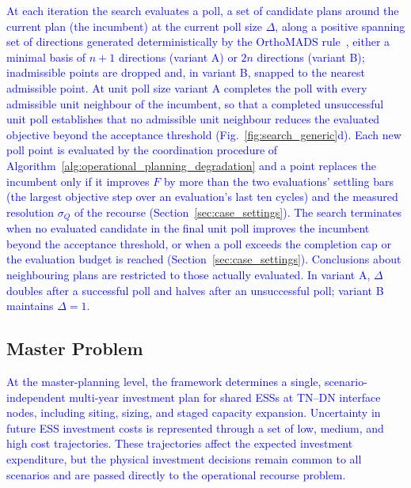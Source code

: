 \documentclass[preprint,12pt]{elsarticle}
\begin{document}
\textcolor{blue}{
    At each iteration the search evaluates a poll, a set of candidate plans around the current plan (the incumbent) at the current poll size $\Delta$, along a positive spanning set of directions generated deterministically by the OrthoMADS rule~\cite{abramson_orthomads_2009}, either a minimal basis of $n+1$ directions (variant A) or $2n$ directions (variant B); inadmissible points are dropped and, in variant B, snapped to the nearest admissible point.
    At unit poll size variant A completes the poll with every admissible unit neighbour of the incumbent, so that a completed unsuccessful unit poll establishes that no admissible unit neighbour reduces the evaluated objective beyond the acceptance threshold (Fig.~\ref{fig:search_generic}d). Each new poll point is evaluated by the coordination procedure of Algorithm~\ref{alg:operational_planning_degradation} and a point replaces the incumbent only if it improves $F$ by more than the two evaluations’ settling bars (the largest objective step over an evaluation’s last ten cycles) and the measured resolution $\sigma_Q$ of the recourse (Section~\ref{sec:case_settings}). 
    The search terminates when no evaluated candidate in the final unit poll improves the incumbent beyond the acceptance threshold, or when a poll exceeds the completion cap or the evaluation budget is reached (Section~\ref{sec:case_settings}). Conclusions about neighbouring plans are restricted to those actually evaluated. 
    In variant A, $\Delta$ doubles after a successful poll and halves after an unsuccessful poll; variant B maintains $\Delta=1$.
}


\subsection{Master Problem}
\label{subsec:master}

\textcolor{blue}{At the master-planning level, the framework determines a single, scenario-independent multi-year investment plan for shared ESSs at TN–DN interface nodes, including siting, sizing, and staged capacity expansion. Uncertainty in future ESS investment costs is represented through a set of low, medium, and high cost trajectories. These trajectories affect the expected investment expenditure, but the physical investment decisions remain common to all scenarios and are passed directly to the operational recourse problem.}
\end{document}

